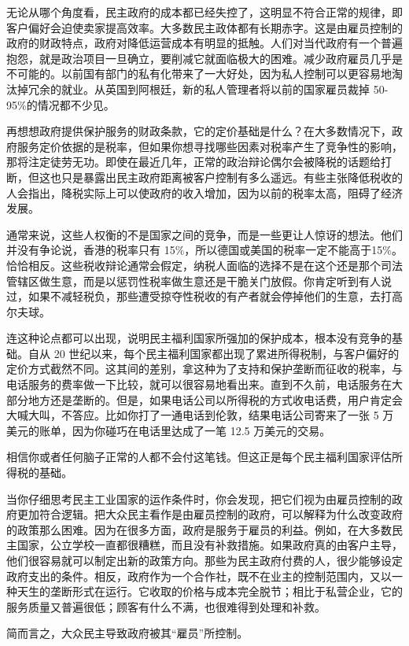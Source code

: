 无论从哪个角度看，民主政府的成本都已经失控了，这明显不符合正常的规律，即客户偏好会迫使卖家提高效率。大多数民主政体都有长期赤字。这是由雇员控制的政府的财政特点，政府对降低运营成本有明显的抵触。人们对当代政府有一个普遍抱怨，就是政治项目一旦确立，要削减它就面临极大的困难。减少政府雇员几乎是不可能的。以前国有部门的私有化带来了一大好处，因为私人控制可以更容易地淘汰掉冗余的就业。从英国到阿根廷，新的私人管理者将以前的国家雇员裁掉 50-95\%的情况都不少见。

再想想政府提供保护服务的财政条款，它的定价基础是什么？在大多数情况下，政府服务定价依据的是税率，但如果你想寻找哪些因素对税率产生了竞争性的影响，那将注定徒劳无功。即使在最近几年，正常的政治辩论偶尔会被降税的话题给打断，但这也只是暴露出民主政府距离被客户控制有多么遥远。有些主张降低税收的人会指出，降税实际上可以使政府的收入增加，因为以前的税率太高，阻碍了经济发展。

通常来说，这些人权衡的不是国家之间的竞争，而是一些更让人惊讶的想法。他们并没有争论说，香港的税率只有 15\%，所以德国或美国的税率一定不能高于15\%。恰恰相反。这些税收辩论通常会假定，纳税人面临的选择不是在这个还是那个司法管辖区做生意，而是以惩罚性税率做生意还是干脆关门放假。你肯定听到有人说过，如果不减轻税负，那些遭受掠夺性税收的有产者就会停掉他们的生意，去打高尔夫球。

连这种论点都可以出现，说明民主福利国家所强加的保护成本，根本没有竞争的基础。自从 20 世纪以来，每个民主福利国家都出现了累进所得税制，与客户偏好的定价方式截然不同。这其间的差别，拿这种为了支持和保护垄断而征收的税率，与电话服务的费率做一下比较，就可以很容易地看出来。直到不久前，电话服务在大部分地方还是垄断的。但是，如果电话公司以所得税的方式收电话费，用户肯定会大喊大叫，不答应。比如你打了一通电话到伦敦，结果电话公司寄来了一张 5 万美元的账单，因为你碰巧在电话里达成了一笔 12.5 万美元的交易。

相信你或者任何脑子正常的人都不会付这笔钱。但这正是每个民主福利国家评估所得税的基础。

当你仔细思考民主工业国家的运作条件时，你会发现，把它们视为由雇员控制的政府更加符合逻辑。把大众民主看作是由雇员控制的政府，可以解释为什么改变政府的政策那么困难。因为在很多方面，政府是服务于雇员的利益。例如，在大多数民主国家，公立学校一直都很糟糕，而且没有补救措施。如果政府真的由客户主导，他们很容易就可以制定出新的政策方向。那些为民主政府付费的人，很少能够设定政府支出的条件。相反，政府作为一个合作社，既不在业主的控制范围内，又以一种天生的垄断形式在运行。它收取的价格与成本完全脱节；相比于私营企业，它的服务质量又普遍很低；顾客有什么不满，也很难得到处理和补救。

简而言之，大众民主导致政府被其“雇员”所控制。

